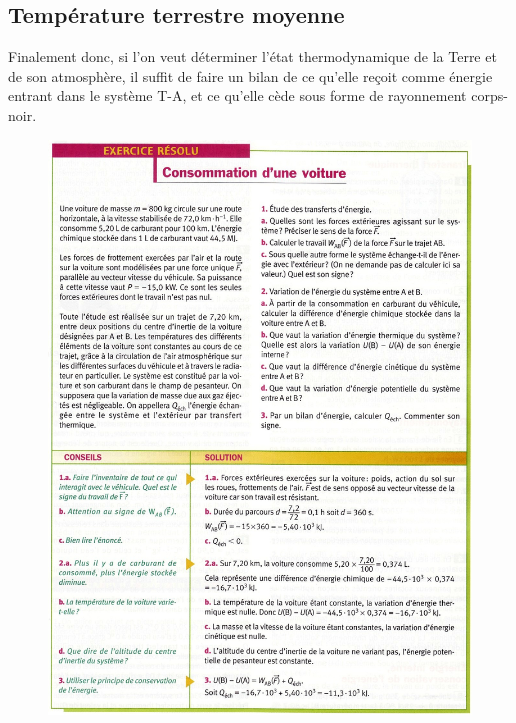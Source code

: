 \documentclass[11pt,a4paper]{article}
\begin{document}
\subsection{Température terrestre moyenne}
Finalement donc, si l'on veut déterminer l'état thermodynamique de la Terre et de son atmosphère, il suffit de faire un bilan de ce qu'elle reçoit comme énergie entrant dans le système T-A, et ce qu'elle cède sous forme de rayonnement corps-noir. 


\begin{figure}[h]
    \centering
    \includegraphics[width=\linewidth]{imgs/p4/xo1.jpg}
\end{figure}
\end{document}
